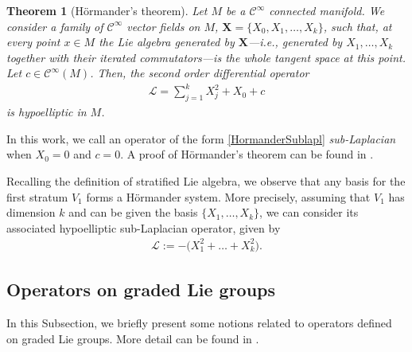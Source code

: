 \documentclass[12pt,oneside,a4paper]{book}
\numberwithin{equation}{section}     %
\theoremstyle{plain}
\newtheorem{theorem}{Theorem}[section]
\theoremstyle{definition}
\newcommand{\slp}{{\mathcal L}}
\begin{document}
\begin{theorem}[H\"ormander's theorem]\label{HormanderTheorem}
	Let $M$ be a $\mathcal{C}^\infty$ connected manifold. We consider a family of $\mathcal{C}^\infty$ vector fields on $M$, $\textbf{X}=\{X_0,X_1,\dots,X_k\}$, such that, at every point $x\in M$ the Lie algebra generated by $\textbf{X}$---i.e., generated by $X_1, \dots, X_k$ together with their iterated commutators---is the whole tangent space at this point. Let $c\in\mathcal{C}^\infty(M)$. Then, the second order differential operator
	\begin{align}\label{HormanderSublapl}
	\mathcal{L}=\sum_{j=1}^{k}X_j^2+X_0+c
	\end{align}
	is hypoelliptic in $M$.
\end{theorem}
In this work, we call an operator of the form \eqref{HormanderSublapl} \textit{sub-Laplacian} when $X_0=0$ and $c=0$. A proof of H\"ormander's theorem can be found in \cite[Appendix]{Ric}. 

Recalling the definition of stratified Lie algebra, we observe that any basis for the first stratum $V_1$ forms a H\"ormander system. More precisely, assuming that $V_1$ has dimension $k$ and can be given the basis $\{X_1,\dots,X_k\}$, we can consider its associated hypoelliptic sub-Laplacian operator, given by
\begin{align}\label{slp}
\slp:=-\big(X_1^2+\dots+X_k^2\big).
\end{align}

\subsection{Operators on graded Lie groups}\label{Sec:Operators}
In this Subsection, we briefly present some notions related to operators defined on graded Lie groups. More detail can be found in \cite[Section 3.1]{FR2016}.
\end{document}
